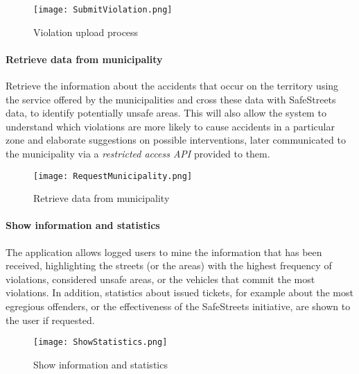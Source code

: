 \clearpage

	\begin{figure}[h]
		\centering
		\texttt{[image: SubmitViolation.png]}
		\caption{
			\label{fig:violationUpload} Violation upload process
		}
	\end{figure}
	
\paragraph{Retrieve data from municipality}
Retrieve the information about the accidents that occur on the territory using the service offered by the municipalities and cross these data with SafeStreets data, to identify potentially unsafe areas. This will also allow the system to understand which violations are more likely to cause accidents in a particular zone and elaborate suggestions on possible interventions, later communicated to the municipality via a \emph{restricted access API} provided to them. \newline
	\begin{figure}[h]
		\centering
		\texttt{[image: RequestMunicipality.png]}
		\caption{
			\label{fig:retrieveMunicipality} Retrieve data from municipality
		}
	\end{figure}
	
\clearpage

\paragraph{Show information and statistics}
The application allows logged users to mine the information that has been received, highlighting the streets (or the areas) with the highest frequency of violations, considered unsafe areas, or the vehicles that commit the most violations. In addition, statistics about issued tickets, for example about the most egregious offenders, or the effectiveness of the SafeStreets initiative, are shown to the user if requested. 
	\newline
	\begin{figure}[h]
		\centering
		\texttt{[image: ShowStatistics.png]}
		\caption{
			\label{fig:showStatistics} Show information and statistics
		}
	\end{figure}
	
